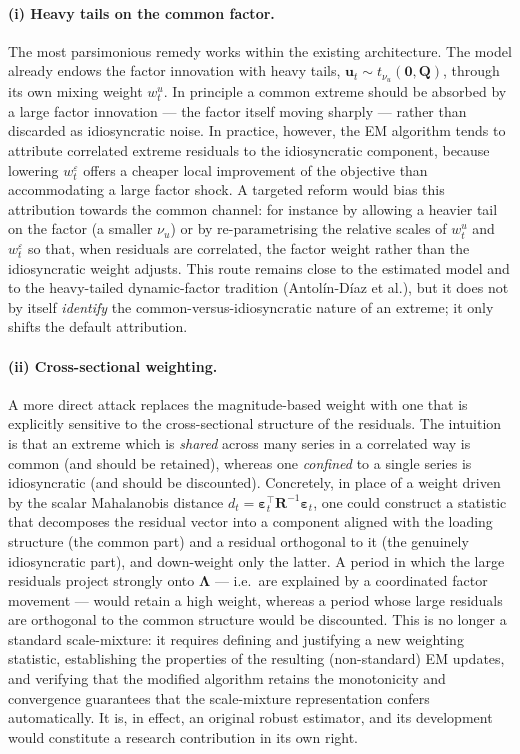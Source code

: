 \documentclass[11pt, a4paper, oneside]{article}
\newcommand{\mL}{\boldsymbol{\Lambda}}
\begin{document}
\paragraph{(i) Heavy tails on the common factor.}
The most parsimonious remedy works within the existing
architecture. The model already endows the factor innovation with
heavy tails, $\mathbf{u}_t \sim t_{\nu_u}(\mathbf{0},\mathbf{Q})$,
through its own mixing weight $w^u_t$. In principle a common
extreme should be absorbed by a large factor innovation --- the
factor itself moving sharply --- rather than discarded as
idiosyncratic noise. In practice, however, the EM algorithm tends
to attribute correlated extreme residuals to the idiosyncratic
component, because lowering $w^\varepsilon_t$ offers a cheaper
local improvement of the objective than accommodating a large
factor shock. A targeted reform would bias this attribution towards
the common channel: for instance by allowing a heavier tail on the
factor (a smaller $\nu_u$) or by re-parametrising the relative
scales of $w^u_t$ and $w^\varepsilon_t$ so that, when residuals are
correlated, the factor weight rather than the idiosyncratic weight
adjusts. This route remains close to the estimated model and to the
heavy-tailed dynamic-factor tradition (Antol\'in-D\'iaz et al.), but
it does not by itself \emph{identify} the common-versus-idiosyncratic
nature of an extreme; it only shifts the default attribution.

\paragraph{(ii) Cross-sectional weighting.}
A more direct attack replaces the magnitude-based weight with one
that is explicitly sensitive to the cross-sectional structure of
the residuals. The intuition is that an extreme which is
\emph{shared} across many series in a correlated way is common
(and should be retained), whereas one \emph{confined} to a single
series is idiosyncratic (and should be discounted). Concretely, in
place of a weight driven by the scalar Mahalanobis distance
$d_t = \boldsymbol{\varepsilon}_t^\top \mathbf{R}^{-1}
\boldsymbol{\varepsilon}_t$, one could construct a statistic that
decomposes the residual vector into a component aligned with the
loading structure (the common part) and a residual orthogonal to it
(the genuinely idiosyncratic part), and down-weight only the
latter. A period in which the large residuals project strongly onto
$\mL$ --- i.e.\ are explained by a coordinated factor
movement --- would retain a high weight, whereas a period whose
large residuals are orthogonal to the common structure would be
discounted. This is no longer a standard scale-mixture: it requires
defining and justifying a new weighting statistic, establishing the
properties of the resulting (non-standard) EM updates, and
verifying that the modified algorithm retains the monotonicity and
convergence guarantees that the scale-mixture representation confers
automatically. It is, in effect, an original robust estimator, and
its development would constitute a research contribution in its own
right.
\end{document}
